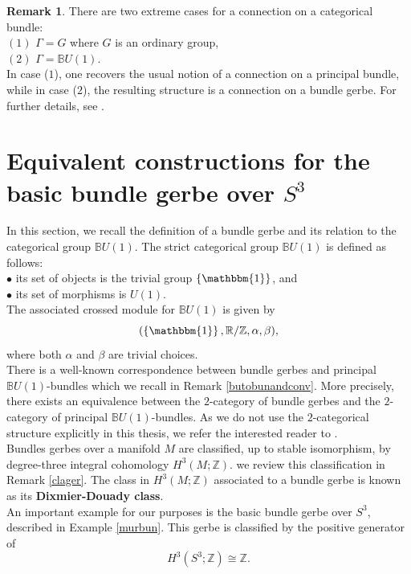 \documentclass{article}
\theoremstyle{plain}
\theoremstyle{definition}
\newtheorem{rem}[thm]{Remark}
\begin{document}
\begin{rem}
There are two extreme cases for a connection on a categorical bundle: \\
$(1)$ $\Gamma = G$ where $G$ is an ordinary group, \\
$(2)$ $\Gamma = \mathbb{B}U(1)$. \\
In case ($1$), one recovers the usual notion of a connection on a principal bundle, while in case ($2$), the resulting structure is a connection on a bundle gerbe. For further details, see \cite[Examples 5.1.9 and 5.1.10 on page 20]{MR3894086}.
\end{rem}

%
\section{Equivalent constructions for the basic bundle gerbe over \texorpdfstring{$S^3$}{S3}}
In this section, we recall the definition of a bundle gerbe and its relation to the categorical group $\mathbb{B}U(1)$. The strict categorical group $\mathbb{B}U(1)$ is defined as follows: \\
$\bullet$ its set of objects is the trivial group $\left\{\mathbbm{1}\right\}$, and \\ 
$\bullet$ its set of morphisms is $U(1)$. \\
The associated crossed module for $\mathbb{B}U(1)$ is given by 
$$(\left\{\mathbbm{1}\right\},\mathbb{R}/\mathbb{Z},\alpha,\beta),$$
where both $\alpha$ and $\beta$ are trivial choices. \\
There is a well-known correspondence between bundle gerbes and principal $\mathbb{B}U(1)$-bundles which we recall in Remark \ref{butobunandconv}. More precisely, there exists an equivalence between the $2$-category of bundle gerbes and the $2$-category of principal $\mathbb{B}U(1)$-bundles. As we do not use the $2$-categorical structure explicitly in this thesis, we refer the interested reader to \cite[Section 7 on page 392]{MR3089401}. \\
Bundles gerbes over a manifold $M$ are classified, up to stable isomorphism, by degree-three integral cohomology $H^3(M;\mathbb{Z})$. we review this classification in Remark \ref{clager}. The class in $H^3(M;\mathbb{Z})$ associated to a bundle gerbe is known as its \textbf{Dixmier-Douady class}.  \\
An important example for our purposes is the basic bundle gerbe over $S^3$, described in Example \ref{murbun}. This gerbe is classified by the positive generator of $$H^3(S^3;\mathbb{Z}) \cong \mathbb{Z}.$$
\end{document}
